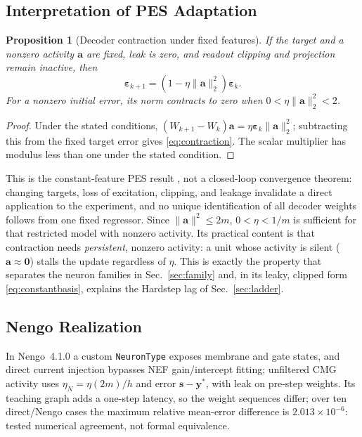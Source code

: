 \documentclass[letterpaper, 10 pt, conference]{ieeeconf}
\newtheorem{proposition}{Proposition}
\begin{document}
\subsection{Interpretation of PES Adaptation}
\begin{proposition}[Decoder contraction under fixed features]\label{prop:pes}
If the target and a nonzero activity $\bm a$ are fixed, leak is zero, and
readout clipping and projection remain inactive, then
\begin{equation}
 \bm\varepsilon_{k+1}
       =(1-\eta\|\bm a\|_2^2)\bm\varepsilon_k.
 \label{eq:contraction}
\end{equation}
For a nonzero initial error, its norm contracts to zero when
$0<\eta\|\bm a\|_2^2<2$.
\end{proposition}
\begin{proof}
Under the stated conditions,
$(W_{k+1}-W_k)\bm a=\eta\bm\varepsilon_k\|\bm a\|_2^2$;
subtracting this from the fixed target error gives
\eqref{eq:contraction}. The scalar multiplier has modulus less than one
under the stated condition.
\end{proof}
This is the constant-feature PES result \cite{voelker2015pes}, not a
closed-loop convergence theorem: changing targets, loss of excitation,
clipping, and leakage invalidate a direct application to the experiment,
and no unique identification of all decoder weights follows from one fixed
regressor. Since $\|\bm a\|^2\le2m$, $0<\eta<1/m$ is sufficient for that
restricted model with nonzero activity. Its practical content is that
contraction needs \emph{persistent}, nonzero activity: a unit whose
activity is silent ($\bm a\approx\bm0$) stalls the update regardless of
$\eta$. This is exactly the property that separates the neuron families in
Sec.~\ref{sec:family} and, in its leaky, clipped form
\eqref{eq:constantbasis}, explains the Hardstep lag of Sec.~\ref{sec:ladder}.

\subsection{Nengo Realization}
In Nengo~4.1.0 a custom \texttt{NeuronType} exposes membrane and gate states, and direct current injection bypasses NEF gain/intercept fitting; unfiltered CMG activity uses $\eta_N=\eta(2m)/h$ and error $\bm s-\bm y^*$, with leak on pre-step weights. Its teaching graph adds a one-step latency, so the weight sequences differ; over ten direct/Nengo cases the maximum relative mean-error difference is $2.013\times10^{-6}$: tested numerical agreement, not formal equivalence.
\end{document}
